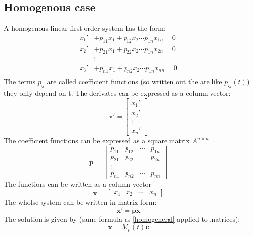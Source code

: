 \subsection{Homogenous case}
A homogenous linear first-order system has the form:
\begin{equation*}
   \begin{split}
      x_1' &+ p_{11}x_1 + p_{12} x_2 \cdots p_{1n}x_{1n} = 0 \\
      x_2' &+ p_{21}x_1 + p_{22} x_2 \cdots p_{1n}x_{2n} = 0 \\
      &\vdots \\
      x_3' &+ p_{n1}x_1 + p_{n2} x_2 \cdots p_{1n}x_{nn}= 0 \\
   \end{split}
\end{equation*}
The terms \(p_{ij}\) are called coefficient functions (so written out the are like \(p_{ij}(t)\)) they only depend on t.
The derivates can be expressed as a column vector:
\begin{equation*}
   \bm{x'} = \begin{bmatrix}
      x_1' \\ x_2' \\ \vdots \\ x_n'
   \end{bmatrix}
\end{equation*}
The coefficient functions can be expressed as a square matrix \(A^{n \times n}\)
\begin{equation}
   \bm{p} = \begin{bmatrix}
      p_{11} & p_{12} & \cdots & p_{1n} \\
      p_{21} & p_{22} & \cdots & p_{2n} \\
      \vdots &        &        &        \\
      p_{n1} & p_{n2} & \cdots & p_{nn}
   \end{bmatrix}
\end{equation}
The functions can be written as a column vector
\begin{equation}
   \bm{x} = \begin{bmatrix}
      x_1 & x_2 & \cdots & x_n
   \end{bmatrix}
\end{equation}
The wholse system can be written in matrix form:
\begin{equation}
   \bm{x'} = \bm{p} \bm{x}
\end{equation}
The solution is given by (same formula as \ref{homogeneral} applied to matrices):
\begin{equation}
   \bm{x} = M_p(t) \bm{c}
\end{equation}

